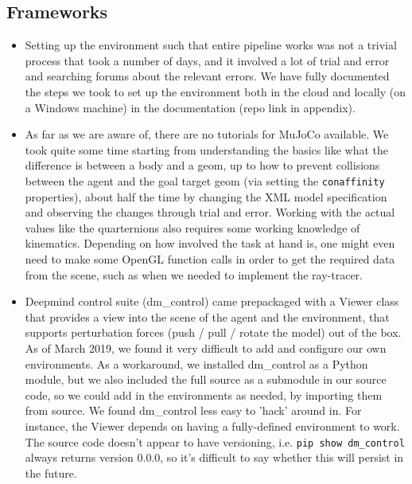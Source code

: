 \documentclass{article}
\begin{document}
\subsection{Frameworks}
\begin{itemize}
	
	\item Setting up the environment such that entire pipeline works was not a trivial process that took a number of days, and it involved a lot of trial and error and searching forums about the relevant errors. We have fully documented the steps we took to set up the environment both in the cloud and locally (on a Windows machine) in the documentation (repo link in appendix).
	
	\item As far as we are aware of, there are no tutorials for MuJoCo \cite{todorov2012mujoco} available. We took quite some time starting from understanding the basics like what the difference is between a body and a geom, up to how to prevent collisions between the agent and the goal target geom (via setting the \texttt{conaffinity} properties), about half the time by changing the XML model specification and observing the changes through trial and error. Working with the actual values like the quarternions also requires some working knowledge of kinematics. Depending on how involved the task at hand is, one might even need to make some OpenGL function calls in order to get the required data from the scene, such as when we needed to implement the ray-tracer.
	
	\item Deepmind control suite (dm\_control) \cite{tassa2018deepmind} came prepackaged with a Viewer class that provides a view into the scene of the agent and the environment, that supports perturbation forces (push / pull / rotate the model) out of the box. As of March 2019, we found it very difficult to add and configure our own environments. As a workaround, we installed dm\_control as a Python module, but we also included the full source as a submodule in our source code, so we could add in the environments as needed, by importing them from source. We found dm\_control less easy to 'hack' around in. For instance, the Viewer depends on having a fully-defined environment to work. The source code doesn't appear to have versioning, i.e. \texttt{pip show dm\_control} always returns version 0.0.0, so it's difficult to say whether this will persist in the future.
	

\end{itemize}
\end{document}

